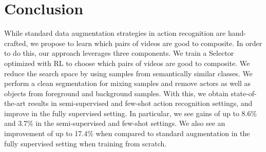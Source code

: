 \documentclass[runningheads]{llncs}
\begin{document}
\section{Conclusion}

While standard data augmentation strategies in action recognition are hand-crafted, we propose to learn which pairs of videos are good to composite. In order to do this, our approach leverages three components. We train a Selector optimized with RL to choose which pairs of videos are good to composite. We reduce the search space by using samples from semantically similar classes. We perform a clean segmentation for mixing samples and remove actors as well as objects from foreground and background samples. With this, we obtain state-of-the-art results in semi-supervised and few-shot action recognition settings, and improve in the fully supervised setting. In particular, we see gains of up to 8.6\% and 3.7\% in the semi-supervised and few-shot settings. We also see an improvement of up to 17.4\% when compared to standard augmentation in the fully supervised setting when training from scratch.


\end{document}
